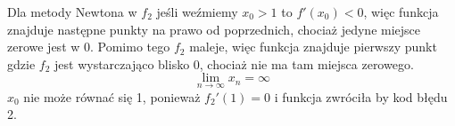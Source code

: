\documentclass{article}
\begin{document}
Dla metody Newtona w $f_{2}$ jeśli weźmiemy $x_{0}>1$ to $f'(x_{0})<0$, więc funkcja znajduje następne punkty na prawo od poprzednich, chociaż jedyne miejsce zerowe jest w 0. Pomimo tego $f_{2}$ maleje, więc funkcja znajduje pierwszy punkt gdzie $f_{2}$ jest wystarczająco blisko 0, chociaż nie ma tam miejsca zerowego.
\[ \lim_{n \to \infty}x_{n}=\infty\]
$x_{0}$ nie może równać się 1, ponieważ $f_{2}'(1)=0$ i funkcja zwróciła by kod błędu 2.
\end{document}
